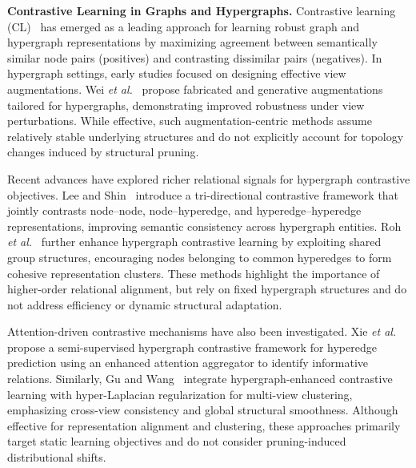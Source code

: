 \documentclass[10pt]{article}
\theoremstyle{plain}
\theoremstyle{definition}
\begin{document}
\textbf{Contrastive Learning in Graphs and Hypergraphs.}
Contrastive learning (CL)~\citep{wang2023adaptive, zheng2022contrastive} has emerged as a leading approach for learning robust graph and hypergraph representations by maximizing agreement between semantically similar node pairs (positives) and contrasting dissimilar pairs (negatives). In hypergraph settings, early studies focused on designing effective view augmentations. Wei \emph{et al.}~\citep{tianxin2022augmentations} propose fabricated and generative augmentations tailored for hypergraphs, demonstrating improved robustness under view perturbations. While effective, such augmentation-centric methods assume relatively stable underlying structures and do not explicitly account for topology changes induced by structural pruning.

Recent advances have explored richer relational signals for hypergraph contrastive objectives. Lee and Shin~\citep{lee2023m} introduce a tri-directional contrastive framework that jointly contrasts node--node, node--hyperedge, and hyperedge--hyperedge representations, improving semantic consistency across hypergraph entities. Roh \emph{et al.}~\citep{roh2024closer} further enhance hypergraph contrastive learning by exploiting shared group structures, encouraging nodes belonging to common hyperedges to form cohesive representation clusters. These methods highlight the importance of higher-order relational alignment, but rely on fixed hypergraph structures and do not address efficiency or dynamic structural adaptation.

Attention-driven contrastive mechanisms have also been investigated. Xie \emph{et al.}~\citep{xie2025hypergraph} propose a semi-supervised hypergraph contrastive framework for hyperedge prediction using an enhanced attention aggregator to identify informative relations. Similarly, Gu and Wang~\citep{Gu2025guhypergraph} integrate hypergraph-enhanced contrastive learning with hyper-Laplacian regularization for multi-view clustering, emphasizing cross-view consistency and global structural smoothness. Although effective for representation alignment and clustering, these approaches primarily target static learning objectives and do not consider pruning-induced distributional shifts.
\end{document}

